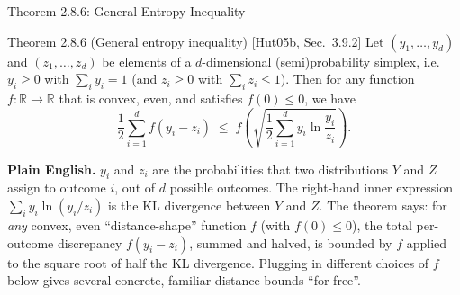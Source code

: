 \documentclass[aspectratio=169,10pt]{beamer}
\begin{document}
\begin{frame}{Theorem 2.8.6: General Entropy Inequality}
  \begin{block}{Theorem 2.8.6 (General entropy inequality) [Hut05b, Sec.\ 3.9.2]}
    Let $(y_1,\ldots,y_d)$ and $(z_1,\ldots,z_d)$ be elements of a
    $d$-dimensional (semi)probability simplex, i.e.\ $y_i\ge 0$ with
    $\sum_i y_i = 1$ (and $z_i \ge 0$ with $\sum_i z_i \le 1$). Then for any
    function $f:\mathbb{R}\to\mathbb{R}$ that is convex, even, and satisfies
    $f(0)\le 0$, we have
    \[
      \frac12 \sum_{i=1}^d f(y_i - z_i) \;\le\; f\!\left(\sqrt{\frac12
      \sum_{i=1}^d y_i \ln\frac{y_i}{z_i}}\right).
    \]
  \end{block}

  \textbf{Plain English.} $y_i$ and $z_i$ are the probabilities that two
  distributions $Y$ and $Z$ assign to outcome $i$, out of $d$ possible
  outcomes. The right-hand inner expression $\sum_i y_i \ln(y_i/z_i)$ is the
  KL divergence between $Y$ and $Z$. The theorem says: for \emph{any} convex,
  even ``distance-shape'' function $f$ (with $f(0)\le 0$), the total
  per-outcome discrepancy $f(y_i-z_i)$, summed and halved, is bounded by $f$
  applied to the square root of half the KL divergence. Plugging in
  different choices of $f$ below gives several concrete, familiar distance
  bounds ``for free''.
\end{frame}
\end{document}
